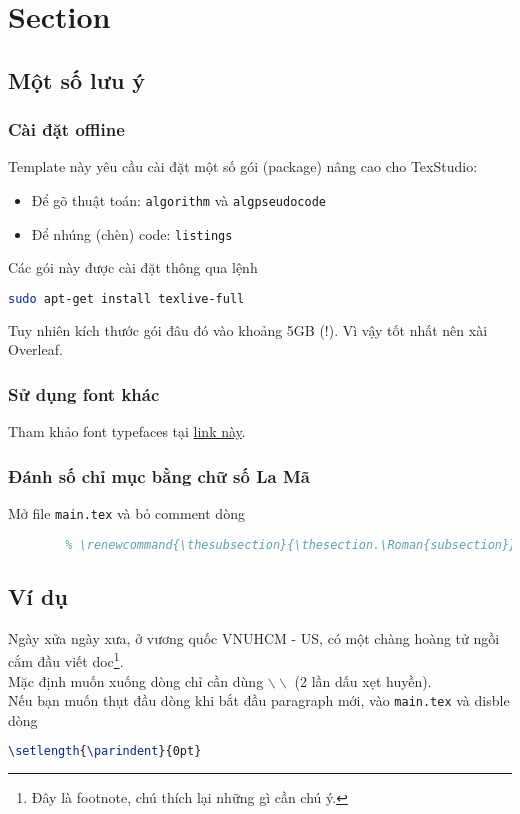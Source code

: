 \documentclass[a4paper,14pt]{article}
\begin{document}
\tableofcontents
\pagebreak
\listoftables
\pagebreak
\listoffigures
\pagebreak

	\section{Section}
	
	\subsection{Một số lưu ý}
	
	\subsubsection{Cài đặt offline}
	Template này yêu cầu cài đặt một số gói (package) nâng cao cho TexStudio:
	\begin{itemize}
		\item Để gõ thuật toán: \texttt{algorithm} và \texttt{algpseudocode}
		\item Để nhúng (chèn) code: \texttt{listings}
	\end{itemize}
	Các gói này được cài đặt thông qua lệnh
	\begin{lstlisting}[language=sh]
		sudo apt-get install texlive-full
	\end{lstlisting}
	Tuy nhiên kích thước gói đâu đó vào khoảng 5GB (!). Vì vậy tốt nhất nên xài Overleaf.
	
	\subsubsection{Sử dụng font khác}
	Tham khảo font typefaces tại \href{https://www.overleaf.com/learn/latex/Font_typefaces}{link này}.
	
	\subsubsection{Đánh số chỉ mục bằng chữ số La Mã}
	Mở file \texttt{main.tex} và bỏ comment dòng 
	\begin{lstlisting}[language=tex]
		% \renewcommand{\thesection}{\Roman{section}}
		% \renewcommand{\thesubsection}{\thesection.\Roman{subsection}}  
	\end{lstlisting}
	
	\subsection{Ví dụ}
	Ngày xửa ngày xưa, ở vương quốc VNUHCM - US, có một chàng hoàng tử ngồi cắm đầu viết doc\footnote{Đây là footnote, chú thích lại những gì cần chú ý.}.\\
	Mặc định muốn xuống dòng chỉ cần dùng $\backslash\backslash$  (2 lần dấu xẹt huyền).\\
	Nếu bạn muốn thụt đầu dòng khi bắt đầu paragraph mới, vào \texttt{main.tex} và disble dòng
	\begin{lstlisting}[language=tex]
		\setlength{\parindent}{0pt}
	\end{lstlisting}
\end{document}
